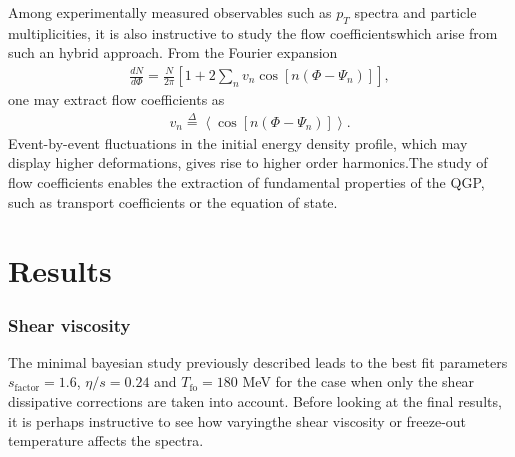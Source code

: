 Among experimentally measured observables such as $p_T$ spectra and particle multiplicities, it is also instructive to study the flow coefficientswhich arise from such an hybrid approach. From the Fourier expansion
\begin{align*}
    \frac{dN}{d\Phi}=\frac{N}{2 \pi} \left[1+2 \sum_{n} v_{n} \cos \left[n\left(\Phi-\Psi_{n}\right)\right]\right],
\end{align*}
one may extract flow coefficients as
\begin{align*}
    v_{n}\overset{\Delta}{=}\left\langle\cos \left[n\left(\Phi-\Psi_{n}\right)\right]\right\rangle.
\end{align*}
Event-by-event fluctuations in the initial energy density profile, which may display higher deformations, gives rise to higher order harmonics.The study of flow coefficients enables the extraction of fundamental properties of the {\sffamily QGP}, such as transport coefficients or the equation of state. 


\section*{Results}
\subsubsection*{Shear viscosity}
The minimal bayesian study previously described leads to the best fit parameters $s_\text{factor}=1.6$, $\eta/s=0.24$ and $T_\text{fo}=180$ MeV for the case when only the shear dissipative corrections are taken into account. Before looking at the final results, it is perhaps instructive to see how varyingthe shear viscosity or freeze-out temperature affects the spectra. 


